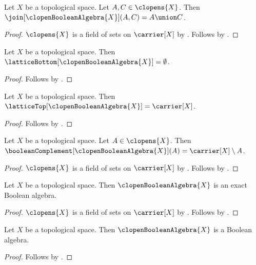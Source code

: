 \begin{proposition}\label{clopen_boolean_algebra_join_apply}
    Let $X$ be a topological space.
    Let $A,C\in\clopens{X}$.
    Then $\join[\clopenBooleanAlgebra{X}](A,C)=A\union C$.
\end{proposition}
\begin{proof}
    $\clopens{X}$ is a field of sets on $\carrier[X]$ by
        .
    Follows by
        .
\end{proof}

\begin{proposition}\label{clopen_boolean_algebra_bottom}
    Let $X$ be a topological space.
    Then $\latticeBottom[\clopenBooleanAlgebra{X}]=\emptyset$.
\end{proposition}
\begin{proof}
    Follows by
        .
\end{proof}

\begin{proposition}\label{clopen_boolean_algebra_top}
    Let $X$ be a topological space.
    Then $\latticeTop[\clopenBooleanAlgebra{X}]=\carrier[X]$.
\end{proposition}
\begin{proof}
    Follows by
        .
\end{proof}

\begin{proposition}\label{clopen_boolean_algebra_complement_apply}
    Let $X$ be a topological space.
    Let $A\in\clopens{X}$.
    Then $\booleanComplement[\clopenBooleanAlgebra{X}](A)=
        \carrier[X]\setminus A$.
\end{proposition}
\begin{proof}
    $\clopens{X}$ is a field of sets on $\carrier[X]$ by
        .
    Follows by
        .
\end{proof}

\begin{theorem}\label{clopen_boolean_algebra_is_exact_boolean_algebra}
    Let $X$ be a topological space.
    Then $\clopenBooleanAlgebra{X}$ is an exact Boolean algebra.
\end{theorem}
\begin{proof}
    $\clopens{X}$ is a field of sets on $\carrier[X]$ by
        .
    Follows by
        .
\end{proof}

\begin{classification}\label{clopen_boolean_algebra_is_boolean_algebra}
    Let $X$ be a topological space.
    Then $\clopenBooleanAlgebra{X}$ is a Boolean algebra.
\end{classification}
\begin{proof}
    Follows by
        .
\end{proof}
